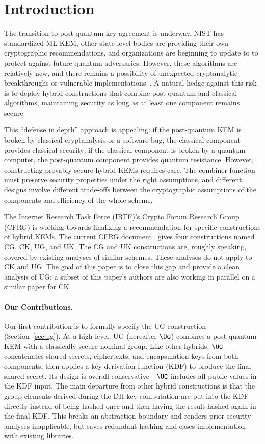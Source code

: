 \section{Introduction}

The transition to post-quantum key agreement is underway. NIST has
standardized ML-KEM, other state-level bodies are providing their own
cryptographic recommendations, and organizations are beginning to update to
to protect against future quantum adversaries. However, these algorithms are
relatively new, and there remains a possibility of unexpected
cryptanalytic breakthroughs or vulnerable implementations~\cite{EC:CasDec23}. A natural hedge
against this risk is to deploy hybrid constructions that combine post-quantum
and classical algorithms, maintaining security as long as at least one
component remains secure.

This ``defense in depth'' approach is appealing: if the post-quantum KEM is
broken by classical cryptanalysis or a software bug, the classical component
provides classical security; if the classical component is broken by a
quantum computer, the post-quantum component provides quantum
resistance. However, constructing provably secure hybrid KEMs requires
care. The combiner function must preserve security properties under the right
assumptions, and different designs involve different trade-offs between the
cryptographic assumptions of the components and efficiency of the whole
scheme.

The Internet Research Task Force (IRTF)'s Crypto Forum Research Group (CFRG) is working towards finalizing a recommendation for specific constructions of hybrid KEMs. The current CFRG document~\cite{irtf-cfrg-hybrid-kems-07} gives four constructions named CG, CK, UG, and UK. The CG and UK constructions are, roughly speaking, covered by existing analyses of similar schemes. These analyses do not apply to CK and UG. The goal of this paper is to close this gap and provide a clean analysis of UG; a subset of this paper's authors are also working in parallel on a similar paper for CK. 

\paragraph{Our Contributions.} Our first contribution is to formally specify the UG construction (Section~\ref{sec:ug}). At a high level, UG (hereafter $\UG$)  combines a
post-quantum KEM with a classically-secure nominal group. Like other hybrids, $\UG$ concatenates shared secrets,
ciphertexts, and encapsulation keys from both components, then applies a key
derivation function (KDF) to produce the final shared secret. Its design is overall conservative---$\UG$ includes all public values in the KDF input. The main departure from other hybrid constructions is that the group elements derived during the DH key computation are put into the KDF directly instead of being hashed once and then having the result hashed again in the final KDF. This breaks an abstraction boundary and renders prior security analyses inapplicable, but saves redundant hashing and eases implementation with existing libraries.

